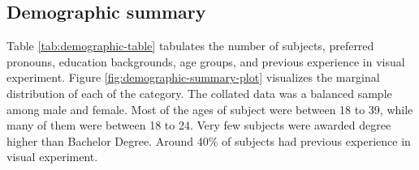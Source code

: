 \documentclass[]{interact}
\theoremstyle{plain}%
\theoremstyle{definition}
\theoremstyle{remark}
\begin{document}
\hypertarget{demographic-summary}{%
\subsection{Demographic summary}\label{demographic-summary}}

Table \ref{tab:demographic-table} tabulates the number of subjects,
preferred pronouns, education backgrounds, age groups, and previous
experience in visual experiment. Figure
\ref{fig:demographic-summary-plot} visualizes the marginal distribution
of each of the category. The collated data was a balanced sample among
male and female. Most of the ages of subject were between 18 to 39,
while many of them were between 18 to 24. Very few subjects were awarded
degree higher than Bachelor Degree. Around 40\% of subjects had previous
experience in visual experiment.
\end{document}
